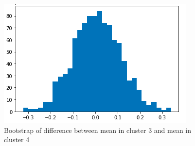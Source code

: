 \documentclass[12pt,a4paper]{article}
\begin{document}
	\begin{figure}[hbtp]
		\centering
		\includegraphics[width=.8\textwidth]{media/cluster_3_cluster_4.png}
		\caption{Bootstrap of difference between mean in cluster 3 and mean in cluster 4}
		\label{fig:cluster3_cluster4_bootstrup}
	\end{figure}
	
\end{document}
